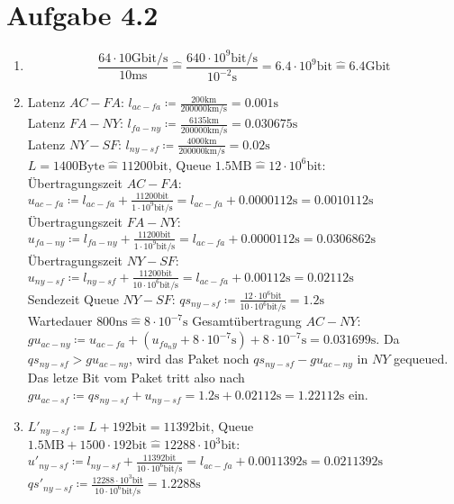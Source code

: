 \documentclass[12pt, a4paper]{article}
\begin{document}
\section*{Aufgabe 4.2}
\begin{enumerate}[label=\alph*)]
	\item	$$\frac{64 \cdot 10 \text{Gbit/s}}{10 \text{ms}} \hat{=} \frac{640 \cdot 10^9 \text{bit/s}}{10^{-2} \text{s}} = 6.4 \cdot 10^9 \text{bit} \hat{=} 6.4 \text{Gbit}$$
	\item	Latenz $AC-FA$: $l_{ac-fa} \coloneqq \frac{200 \text{km}}{200000 \text{km/s}} = 0.001 \text{s}$ \\
			Latenz $FA-NY$: $l_{fa-ny} \coloneqq \frac{6135 \text{km}}{200000 \text{km/s}} = 0.030675 \text{s}$ \\
			Latenz $NY-SF$: $l_{ny-sf} \coloneqq \frac{4000 \text{km}}{200000 \text{km/s}} = 0.02 \text{s}$ \\
			
			$L=1400 \text{Byte} \hat{=} 11200 \text{bit}$, Queue $1.5 \text{MB} \hat{=} 12 \cdot 10^6 \text{bit}$: \\
			Übertragungszeit $AC-FA$: $u_{ac-fa} \coloneqq l_{ac-fa} + \frac{11200 \text{bit}}{1 \cdot 10^9 \text{bit/s}} = l_{ac-fa} + 0.0000112 \text{s} = 0.0010112 \text{s}$ \\
			Übertragungszeit $FA-NY$: $u_{fa-ny} \coloneqq l_{fa-ny} + \frac{11200 \text{bit}}{1 \cdot 10^9 \text{bit/s}} = l_{ac-fa} + 0.0000112 \text{s} = 0.0306862 \text{s}$ \\
			Übertragungszeit $NY-SF$: $u_{ny-sf} \coloneqq l_{ny-sf} + \frac{11200 \text{bit}}{10 \cdot 10^6 \text{bit/s}} = l_{ac-fa} + 0.00112 \text{s} = 0.02112 \text{s}$ \\
			Sendezeit Queue $NY-SF$: $qs_{ny-sf} \coloneqq \frac{12 \cdot 10^6 \text{bit}}{10 \cdot 10^6 \text{bit/s}} = 1.2 \text{s}$\\
			
			Wartedauer $800 \text{ns} \hat{=} 8 \cdot 10^{-7} \text{s}$
			Gesamtübertragung $AC-NY$: $gu_{ac-ny} \coloneqq u_{ac-fa} + (u_{fa_ny} + 8 \cdot 10^{-7} \text{s}) + 8 \cdot 10^{-7} \text{s} = 0.031699 \text{s}$.
			Da $qs_{ny-sf} > gu_{ac-ny}$, wird das Paket noch $qs_{ny-sf} - gu_{ac-ny}$ in $NY$ gequeued. Das letze Bit vom Paket tritt also nach $gu_{ac-sf} \coloneqq qs_{ny-sf} + u_{ny-sf} = 1.2 \text{s} + 0.02112 \text{s} = 1.22112 \text{s}$ ein.
	\item	$L'_{ny-sf} \coloneqq L + 192 \text{bit} = 11392 \text{bit}$, Queue $1.5 \text{MB} + 1500 \cdot 192 \text{bit} \hat{=} 12288 \cdot 10^3 \text{bit}$: \\
			$u'_{ny-sf} \coloneqq l_{ny-sf} + \frac{11392 \text{bit}}{10 \cdot 10^6 \text{bit/s}} = l_{ac-fa} + 0.0011392 \text{s} = 0.0211392 \text{s}$ \\
			$qs'_{ny-sf} \coloneqq \frac{12288 \cdot 10^3 \text{bit}}{10 \cdot 10^6 \text{bit/s}} = 1.2288 \text{s}$\\
			

\end{enumerate}
\end{document}
